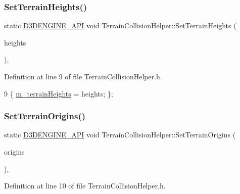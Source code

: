 \subsubsection{\texorpdfstring{Set\+Terrain\+Heights()}{SetTerrainHeights()}}
{\footnotesize\ttfamily static \mbox{\hyperlink{stdafx_8h_a8ee2d990c5dfba7794dd2b60741d7722}{D3\+D\+E\+N\+G\+I\+N\+E\+\_\+\+A\+PI}} void Terrain\+Collision\+Helper\+::\+Set\+Terrain\+Heights (\begin{DoxyParamCaption}\item[{std\+::shared\+\_\+ptr$<$ std\+::vector$<$ std\+::shared\+\_\+ptr$<$ std\+::vector$<$ std\+::vector$<$ float $>$$>$$>$$>$$>$}]{heights }\end{DoxyParamCaption})\hspace{0.3cm}{\ttfamily [inline]}, {\ttfamily [static]}}



Definition at line 9 of file Terrain\+Collision\+Helper.\+h.


\begin{DoxyCode}
9 \{ \mbox{\hyperlink{class_terrain_collision_helper_a479800d07e04731ce3ac8093aba52fa0}{m\_terrainHeights}} = heights; \};
\end{DoxyCode}
\mbox{\label{class_terrain_collision_helper_aa2df0c6cbe00dd3ac6fb6e75f9532c82}} 
\subsubsection{\texorpdfstring{Set\+Terrain\+Origins()}{SetTerrainOrigins()}}
{\footnotesize\ttfamily static \mbox{\hyperlink{stdafx_8h_a8ee2d990c5dfba7794dd2b60741d7722}{D3\+D\+E\+N\+G\+I\+N\+E\+\_\+\+A\+PI}} void Terrain\+Collision\+Helper\+::\+Set\+Terrain\+Origins (\begin{DoxyParamCaption}\item[{std\+::shared\+\_\+ptr$<$ std\+::vector$<$ X\+M\+F\+L\+O\+A\+T4 $>$$>$}]{origins }\end{DoxyParamCaption})\hspace{0.3cm}{\ttfamily [inline]}, {\ttfamily [static]}}



Definition at line 10 of file Terrain\+Collision\+Helper.\+h.


